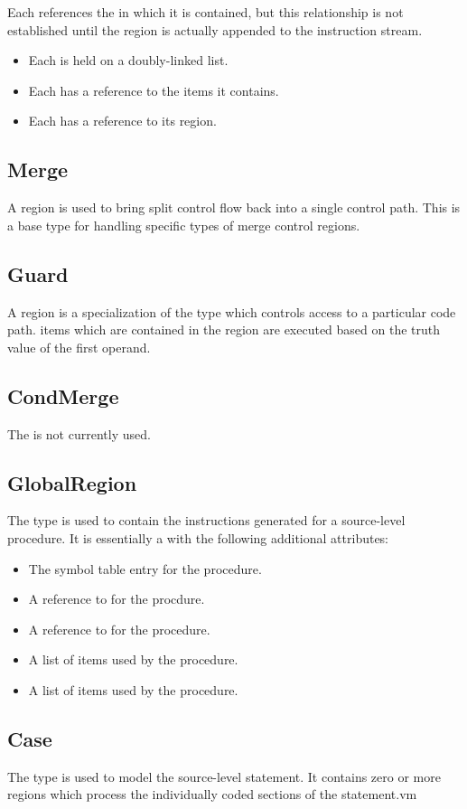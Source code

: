 Each  references the  in which it is
contained, but this relationship is not established until the region
is actually appended to the instruction stream.

\begin{itemize}
\item Each is held on a doubly-linked list.
\item Each has a reference to the  items it
  contains.
\item Each has a reference to its  region.
\end{itemize}

\subsection{Merge}

A  region is used to bring split control flow back into a
single control path.  This is a base type for handling specific types
of merge control regions.

\subsection{Guard}

A  region is a specialization of the  type
which controls access to a particular code path.  
items which are contained in the  region are executed
based on the truth value of the first operand.

\subsection{CondMerge}

The  is not currently used.

\subsection{GlobalRegion}
The  type is used to contain the instructions
generated for a source-level procedure.  It is essentially a
 with the following additional attributes:

\begin{itemize}
\item The symbol table entry for the procedure.
\item A reference to  for the procdure.
\item A reference to  for the procedure.
\item A list of  items used by the procedure.
\item A list of  items used by the procedure.
\end{itemize}

\subsection{Case}
The  type is used to model the source-level 
statement.  It contains zero or more regions which process the
individually coded sections of the  statement.vm
